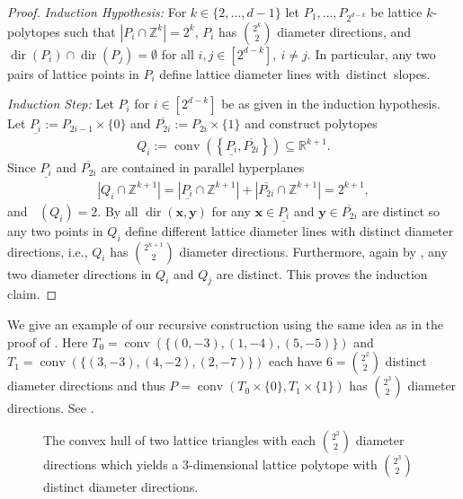 \documentclass[11pt]{article}
\newcommand{\bx}{\mathbf{x}}
\newcommand{\by}{\mathbf{y}}
\newcommand{\R}{\mathbb{R}}
\newcommand{\Z}{\mathbb{Z}}
\DeclareMathOperator{\conv}{conv}
\DeclareMathOperator{\dir}{dir}
\DeclareMathOperator{\ldiam}{diam_\Z}
\newcommand{\lp}{\left(}
\newcommand{\rp}{\right)}
\newcommand{\lb}{\left\{}
\newcommand{\rb}{\right\}}
\begin{document}
\begin{proof}
    \emph{Induction Hypothesis:} For $k \in \{2, \ldots, d-1\}$ let $P_1, \ldots, P_{2^{d-k}}$ be lattice $k$-polytopes such that $|P_i \cap \Z^k| = 2^k$, $P_i$ has $\binom{2^k}{2}$ diameter directions, and $\dir(P_i) \cap \dir(P_j)  = \emptyset$ for all $i,j \in [2^{d-k}], \ i \neq j$. In particular, any two pairs of lattice points in $P_i$ define lattice diameter lines \mbox{with distinct slopes.}

    \emph{Induction Step:} Let $P_i$ for $i \in [2^{d-k}]$ be as given in the induction hypothesis. Let $\underline{P_i}:= P_{2i-1} \times \{0\}$ and $\overline{P_{2i}}:= P_{2i} \times \{1\}$ and construct polytopes
    \begin{align*}
        Q_i:= \conv \lp \lb \underline{P_i},\overline{P_{2i}}  \rb \rp\subseteq \R^{k+1}.
    \end{align*}
    Since $\underline{P_i}$ and $\overline{P_{2i}}$ are contained in parallel hyperplanes
    \begin{align*}
        |Q_i \cap \Z^{k+1}| = |\underline{P_i} \cap \Z^{k+1}| +|\overline{P_{2i}} \cap \Z^{k+1}| = 2^{k+1}, 
    \end{align*}
    and $\ldiam(Q_i)=2$. By  all $\dir(\bx,\by)$ for any $\bx \in \underline{P_i}$ and $\by \in \overline{P_{2i}}$ are distinct so any two points in $Q_i$ define different lattice diameter lines with distinct diameter directions, i.e., $Q_i$ has $\binom{2^{k+1}}{2}$ diameter directions. Furthermore, again by , any two diameter directions in $Q_i$ and $Q_j$ are distinct.
    This proves the induction claim. 
\end{proof}

\begin{example}
    We give an example of our recursive construction using the same idea as in the proof of \mbox{}.
    Here $T_0=\conv(\{(0,-3), (1,-4), (5,-5)\})$ and $T_1 = \conv(\{ (3,-3),(4,-2), (2,-7)\})$ each have $6=\binom{2^2}{2}$ distinct diameter directions and thus $P = \conv( T_0 \times \{0\}, T_1 \times \{1\})$ has $\binom{2^3}{2}$ diameter directions. See .
\begin{figure}[ht!]
    \centering
    
    \caption{The convex hull of two lattice triangles with each $\binom{2^2}{2}$ diameter directions which yields a $3$-dimensional lattice polytope with $\binom{2^3}{2}$ distinct diameter directions.}
    \label{fig:construction-diam-dir}
\end{figure}
%
\end{example}
\end{document}
